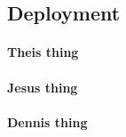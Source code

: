 \subsection{Deployment}
\paragraph{Theis thing}
%
%
\paragraph{Jesus thing}
%
%
\paragraph{Dennis thing}
%
%